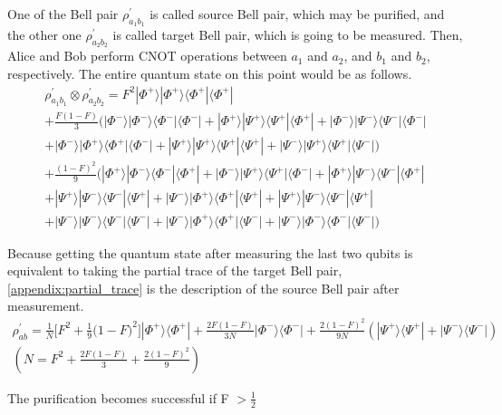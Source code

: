 One of the Bell pair $\rho^{'}_{a_1 b_1}$ is called source Bell pair, which may be purified, and the other one $\rho^{'}_{a_2 b_2}$  is called target Bell pair, which is going to be measured. Then, Alice and Bob perform CNOT operations between $a_1$ and $a_2$, and $b_1$ and $b_2$, respectively.
The entire quantum state on this point would be as follows.
\begin{align}
  \rho^{'}_{a_1 b_1} \otimes \rho^{'}_{a_2 b_2} = F^2|\Phi^+\rangle|\Phi^+\rangle\langle\Phi^+|\langle\Phi^+| \nonumber\\ 
  + \frac{F(1-F)}{3}(|\Phi^-\rangle|\Phi^-\rangle\langle\Phi^-|\langle\Phi^-|+|\Phi^+\rangle|\Psi^+\rangle\langle\Psi^+|\langle\Phi^+|+|\Phi^-\rangle|\Psi^-\rangle\langle\Psi^-|\langle\Phi^-| \nonumber\\
  +|\Phi^-\rangle|\Phi^+\rangle\langle\Phi^+|\langle\Phi^-|+|\Psi^+\rangle|\Psi^+\rangle\langle\Psi^+|\langle\Psi^+|+|\Psi^-\rangle|\Psi^+\rangle\langle\Psi^+|\langle\Psi^-|) \nonumber\\ 
  + \frac{(1-F)^2}{9}(|\Phi^+\rangle|\Phi^-\rangle\langle\Phi^-|\langle\Phi^+|+|\Phi^-\rangle|\Psi^+\rangle\langle\Psi^+|\langle\Phi^-|+|\Phi^+\rangle|\Psi^-\rangle\langle\Psi^-|\langle\Phi^+| \nonumber\\
  + |\Psi^+\rangle|\Psi^-\rangle\langle\Psi^-|\langle\Psi^+|+|\Psi^-\rangle|\Phi^+\rangle\langle\Phi^+|\langle\Psi^+|+|\Psi^+\rangle|\Psi^-\rangle\langle\Psi^-|\langle\Psi^+| \nonumber\\
  +|\Psi^-\rangle|\Psi^-\rangle\langle\Psi^-|\langle\Psi^-|+|\Psi^-\rangle|\Phi^+\rangle\langle\Phi^+|\langle\Psi^-|+|\Psi^-\rangle|\Phi^-\rangle\langle\Phi^-|\langle\Psi^-|)
  \end{align}

Because getting the quantum state after measuring the last two qubits is equivalent to taking the partial trace of the target Bell pair, \ref{appendix:partial_trace} is the description of the source Bell pair after measurement.
\begin{align}
  \rho^{'}_{ab} = \frac{1}{N} \big[ F^2 + \frac{1}{9}\big(1-F \big)^2\big]|\Phi^+\rangle\langle\Phi^+| + \frac{2F(1-F)}{3N}|\Phi^-\rangle\langle\Phi^-| + \frac{2(1-F)^2}{9N}(|\Psi^+\rangle\langle\Psi^+| + |\Psi^-\rangle\langle\Psi^-|) \nonumber\\
  (N = F^2 + \frac{2F(1-F)}{3} + \frac{2(1-F)^2}{9})
  \label{appendix:partial_trace}
\end{align}

The purification becomes successful if F  $> \frac{1}{2}$



